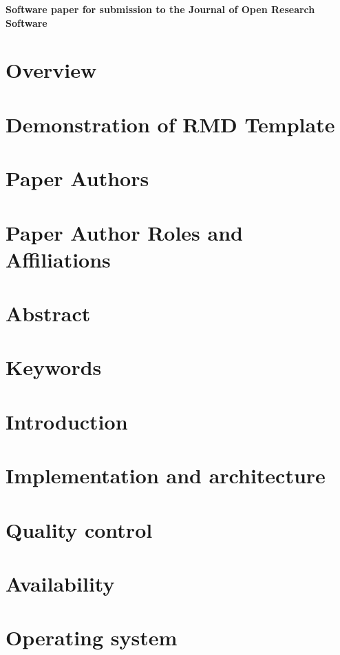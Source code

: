 \documentclass{jors}
\begin{document}
{\bf Software paper for submission to the Journal of Open Research Software}

\section{Overview}

\section*{Demonstration of RMD Template}

\section*{Paper Authors}

\section*{Paper Author Roles and Affiliations}

\section*{Abstract}

\section*{Keywords}

\section*{Introduction}

\section*{Implementation and architecture}

\section*{Quality control}

\section{Availability}

\section*{Operating system}
\end{document}

